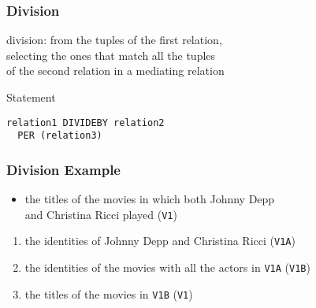 \documentclass[dvipsnames]{beamer}
\theoremstyle{plain}
\begin{document}
\begin{frame}[fragile]
  \frametitle{Division}

  \begin{definition}
    \alert{division}: from the tuples of the first relation,\\
      selecting the ones that match all the tuples\\
      of the second relation in a mediating relation
  \end{definition}

  \pause
  \begin{block}{Statement}
    \begin{lstlisting}
relation1 DIVIDEBY relation2
  PER (relation3)
    \end{lstlisting}
  \end{block}
\end{frame}

\begin{frame}
  \frametitle{Division Example}

  \begin{example}
    \begin{itemize}
      \item the titles of the movies in which both Johnny Depp\\
        and Christina Ricci played (\texttt{V1})
    \end{itemize}

    \pause
    \begin{enumerate}
      \item the identities of Johnny Depp and Christina Ricci (\texttt{V1A})

      \pause
      \item the identities of the movies with all the actors in \texttt{V1A}
        (\texttt{V1B})

      \pause
      \item the titles of the movies in \texttt{V1B} (\texttt{V1})
    \end{enumerate}
  \end{example}
\end{frame}
\end{document}
